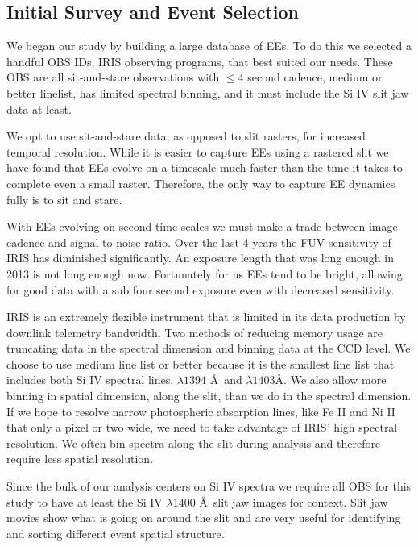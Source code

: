 \documentclass[]{aastex6}
\begin{document}
	\subsection{Initial Survey and Event Selection}
	We began our study by building a large database of EEs.  To do this we selected a handful OBS IDs, IRIS observing programs, that best suited our needs.  These OBS are all sit-and-stare observations with $\leq 4$ second cadence, medium or better linelist, has limited spectral binning, and it must include the Si IV slit jaw data at least.   
	
	We opt to use sit-and-stare data, as opposed to slit rasters, for increased temporal resolution.  While it is easier to capture EEs using a rastered slit we have found that EEs evolve on a timescale much faster than the time it takes to complete even a small raster.  Therefore, the only way to capture EE dynamics fully is to sit and stare.  
	
	With EEs evolving on second time scales we must make a trade between image cadence and signal to noise ratio.  Over the last 4 years the FUV sensitivity of IRIS has diminished significantly.  An exposure length that was long enough in 2013 is not long enough now.  Fortunately for us EEs tend to be bright, allowing for good data with a sub four second exposure even with decreased sensitivity.  
	
	IRIS is an extremely flexible instrument that is limited in its data production by downlink telemetry bandwidth.  Two methods of reducing memory usage are truncating data in the spectral dimension and binning data at the CCD level.  We choose to use medium line list or better because it is the smallest line list that includes both Si IV spectral lines, $\lambda 1394$ \AA\  and $\lambda 1403$\AA.  We also allow more binning in spatial dimension, along the slit, than we do in the spectral dimension. If we hope to resolve narrow photospheric absorption lines, like Fe II and Ni II that only a pixel or two wide, we need to take advantage of IRIS' high spectral resolution.  We often bin spectra along the slit during analysis and therefore require less spatial resolution.
	
	Since the bulk of our analysis centers on Si IV spectra we require all OBS for this study to have at least the Si IV $\lambda1400$ \AA \ slit jaw images for context.  Slit jaw movies show what is going on around the slit and are very useful for identifying and sorting different event spatial structure.
	
\end{document}
